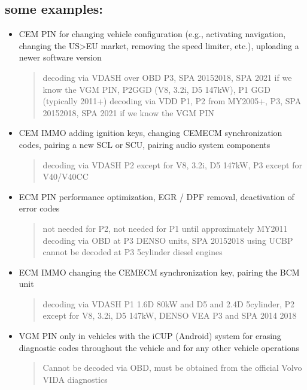 \documentclass[letterpaper,10pt,english]{sphinxmanual}
\begin{document}
\subsection{some examples:}
\label{\detokenize{hacking/pincode:some-examples}}\begin{itemize}
\item {} 
\sphinxAtStartPar
CEM PIN \textendash{} for changing vehicle configuration (e.g., activating navigation, changing the US\textgreater{}EU market, removing the speed limiter, etc.), uploading a newer software version
\begin{quote}

\sphinxAtStartPar
decoding via VDASH over OBD \textendash{} P3, SPA 2015\sphinxhyphen{}2018, SPA 2021 if we know the VGM PIN, P2GGD (V8, 3.2i, D5 147kW), P1 GGD (typically 2011+)
decoding via VDD \textendash{} P1, P2 from MY2005+, P3, SPA 2015\sphinxhyphen{}2018, SPA 2021 if we know the VGM PIN
\end{quote}

\item {} 
\sphinxAtStartPar
CEM IMMO \textendash{} adding ignition keys, changing CEM\sphinxhyphen{}ECM synchronization codes, pairing a new SCL or SCU, pairing audio system components
\begin{quote}

\sphinxAtStartPar
decoding via VDASH P2 except for V8, 3.2i, D5 147kW, P3 except for V40/V40CC
\end{quote}

\item {} 
\sphinxAtStartPar
ECM PIN \textendash{} performance optimization, EGR / DPF removal, deactivation of error codes
\begin{quote}

\sphinxAtStartPar
not needed for P2, not needed for P1 until approximately MY2011
decoding via OBD at P3 DENSO units, SPA 2015\sphinxhyphen{}2018 using UCBP
cannot be decoded at P3 5\sphinxhyphen{}cylinder diesel engines
\end{quote}

\item {} 
\sphinxAtStartPar
ECM IMMO \textendash{} changing the CEM\sphinxhyphen{}ECM synchronization key, pairing the BCM unit
\begin{quote}

\sphinxAtStartPar
decoding via VDASH P1 1.6D 80kW and D5 and 2.4D 5\sphinxhyphen{}cylinder, P2 except for V8, 3.2i, D5 147kW, DENSO VEA P3 and SPA 2014 \textendash{} 2018
\end{quote}

\item {} 
\sphinxAtStartPar
VGM PIN \textendash{} only in vehicles with the iCUP (Android) system for erasing diagnostic codes throughout the vehicle and for any other vehicle operations
\begin{quote}

\sphinxAtStartPar
Cannot be decoded via OBD, must be obtained from the official Volvo VIDA diagnostics
\end{quote}

\end{itemize}
\end{document}
